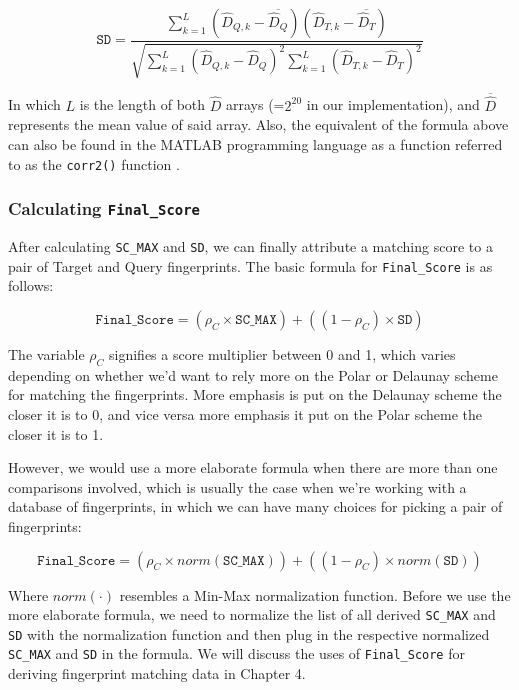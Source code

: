 \documentclass[fyp]{socreport}
\begin{document}
\begin{equation}
	\mathtt{SD} = \frac{\sum_{k=1}^{L} (\widehat{D}_{Q,k} - \overline{\widehat{D}_Q}) (\widehat{D}_{T,k} - \overline{\widehat{D}_T})}{\sqrt{\sum_{k=1}^{L} (\widehat{D}_{Q,k} - \widehat{D}_Q)^2 \sum_{k=1}^{L} (\widehat{D}_{T,k} - \widehat{D}_T)^2}}
\end{equation}

In which $L$ is the length of both $\widehat{D}$ arrays (=$2^{20}$ in our implementation), and $\overline{\widehat{D}}$ represents the mean value of said array. Also, the equivalent of the formula above can also be found in the MATLAB programming language as a function referred to as the \texttt{corr2()} function \cite{corr2}. 

\subsubsection{Calculating \texttt{Final\_Score}}
After calculating \texttt{SC\_MAX} and \texttt{SD}, we can finally attribute a matching score to a pair of Target and Query fingerprints. The basic formula for \texttt{Final\_Score} is as follows:

\begin{equation}
	\mathtt{Final\_Score} = (\rho_C \times \mathtt{SC\_MAX}) + ((1- \rho_C) \times \mathtt{SD})
\end{equation}

The variable $\rho_C$ signifies a score multiplier between 0 and 1, which varies depending on whether we'd want to rely more on the Polar or Delaunay scheme for matching the fingerprints. More emphasis is put on the Delaunay scheme the closer it is to 0, and vice versa more emphasis it put on the Polar scheme the closer it is to 1. 

However, we would use a more elaborate formula when there are more than one comparisons involved, which is usually the case when we're working with a database of fingerprints, in which we can have many choices for picking a pair of fingerprints:

\begin{equation}
	\mathtt{Final\_Score} = (\rho_C \times norm(\mathtt{SC\_MAX})) + ((1- \rho_C) \times norm(\mathtt{SD}))
\end{equation}

Where $norm(\cdot)$ resembles a Min-Max normalization function. Before we use the more elaborate formula, we need to normalize the list of all derived \texttt{SC\_MAX} and \texttt{SD} with the normalization function and then plug in the respective normalized \texttt{SC\_MAX} and \texttt{SD} in the formula. We will discuss the uses of \texttt{Final\_Score} for deriving fingerprint matching data in Chapter 4.
\end{document}

